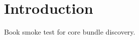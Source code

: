 \documentclass{book}
\begin{document}
\chapter{Introduction}
Book smoke test for core bundle discovery.
\end{document}
